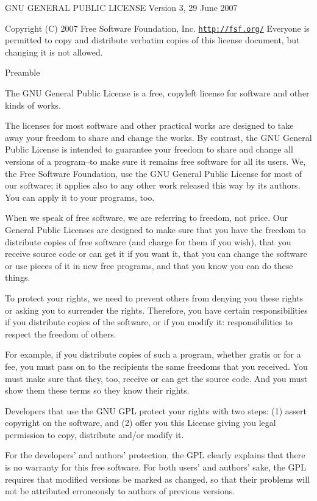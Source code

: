G\-N\-U G\-E\-N\-E\-R\-A\-L P\-U\-B\-L\-I\-C L\-I\-C\-E\-N\-S\-E Version 3, 29 June 2007

Copyright (C) 2007 Free Software Foundation, Inc. \href{http://fsf.org/}{\tt http\-://fsf.\-org/} Everyone is permitted to copy and distribute verbatim copies of this license document, but changing it is not allowed.

Preamble

The G\-N\-U General Public License is a free, copyleft license for software and other kinds of works.

The licenses for most software and other practical works are designed to take away your freedom to share and change the works. By contrast, the G\-N\-U General Public License is intended to guarantee your freedom to share and change all versions of a program--to make sure it remains free software for all its users. We, the Free Software Foundation, use the G\-N\-U General Public License for most of our software; it applies also to any other work released this way by its authors. You can apply it to your programs, too.

When we speak of free software, we are referring to freedom, not price. Our General Public Licenses are designed to make sure that you have the freedom to distribute copies of free software (and charge for them if you wish), that you receive source code or can get it if you want it, that you can change the software or use pieces of it in new free programs, and that you know you can do these things.

To protect your rights, we need to prevent others from denying you these rights or asking you to surrender the rights. Therefore, you have certain responsibilities if you distribute copies of the software, or if you modify it\-: responsibilities to respect the freedom of others.

For example, if you distribute copies of such a program, whether gratis or for a fee, you must pass on to the recipients the same freedoms that you received. You must make sure that they, too, receive or can get the source code. And you must show them these terms so they know their rights.

Developers that use the G\-N\-U G\-P\-L protect your rights with two steps\-: (1) assert copyright on the software, and (2) offer you this License giving you legal permission to copy, distribute and/or modify it.

For the developers' and authors' protection, the G\-P\-L clearly explains that there is no warranty for this free software. For both users' and authors' sake, the G\-P\-L requires that modified versions be marked as changed, so that their problems will not be attributed erroneously to authors of previous versions.

